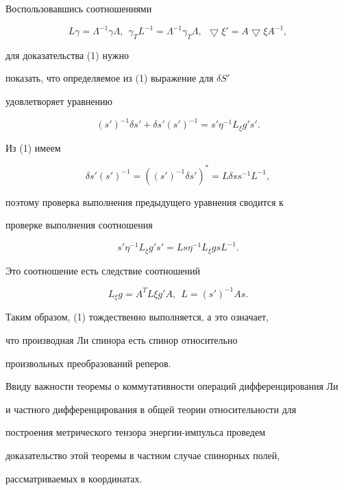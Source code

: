 Воспользовавшись соотношениями


$$


L\gamma=\Lambda^{-1}\gamma\Lambda,\ \ \gamma_TL^{-1}=


\Lambda^{-1}\gamma_T\Lambda,\ \ \bigtriangledown\xi'=A\bigtriangledown\xi


A^{-1},


$$


для доказательства (1) нужно


показать, что определяемое из (1) выражение для $\delta S'$


удовлетворяет уравнению


$$


(s'{})^{-1}\delta s'+\delta s'(s'{})^{-1}=s'\eta^{-1}L_\xi g's'.


$$


Из (1) имеем


$$


\delta s'(s'{})^{-1}=((s'{})^{-1}\delta s')^*=L\delta ss^{-1}L^{-1},


$$


поэтому проверка выполнения предыдущего уравнения сводится к


проверке выполнения соотношения


$$


s'\eta^{-1}L_\xi g's'=Ls\eta^{-1}L_\xi g sL^{-1}.


$$


Это соотношение есть следствие соотношений


$$


L_\xi g=A^TL\xi g'A,\ \ L=(s'{})^{-1}As.


$$


Таким образом, (1) тождественно выполняется, а это означает,


что производная Ли спинора есть спинор относительно


произвольных преобразований реперов.





Ввиду важности теоремы о коммутативности операций дифференцирования Ли 


и частного дифференцирования в общей теории относительности для


построения метрического тензора энергии-импульса проведем


доказательство этой теоремы в частном случае спинорных полей,


рассматриваемых в координатах.





